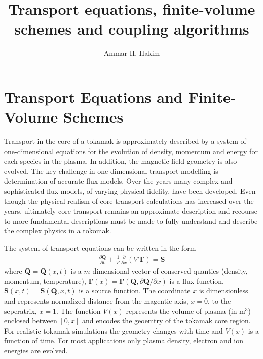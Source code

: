 \documentclass[11pt]{amsart}
\title{Transport equations, finite-volume schemes and coupling
  algorithms}%
\author{Ammar H. Hakim}%
\date{}
\newcommand{\pfrac}[2]{\frac{\partial #1}{\partial #2}}
\newcommand{\pfraca}[1]{\frac{\partial}{\partial #1}}
\newcommand{\pfracb}[2]{\partial #1/\partial #2}
\newcommand{\mvec}[1]{\mathbf{#1}}
\newcommand{\gvec}[1]{\boldsymbol{#1}}
\begin{document}
\maketitle

\section{Transport Equations and Finite-Volume Schemes}

Transport in the core of a tokamak is approximately described by a
system of one-dimensional equations for the evolution of density,
momentum and energy for each species in the plasma. In addition, the
magnetic field geometry is also evolved. The key challenge in
one-dimensional transport modelling is determination of accurate flux
models. Over the years many complex and sophisticated flux models, of
varying physical fidelity, have been developed. Even though the
physical realism of core transport calculations has increased over the
years, ultimately core transport remains an approximate description
and recourse to more fundamental descriptions must be made to fully
understand and describe the complex physics in a tokomak.

The system of transport equations can be written in the form
\begin{align}
  \pfrac{\mvec{Q}}{t} 
  + \frac{1}{V'} \pfraca{x} \left( V' \gvec{\Gamma} \right) = \mvec{S}
\end{align}
where $\mvec{Q} = \mvec{Q}(x,t)$ is a $m$-dimensional vector of
conserved quanties (density, momentum, temperature), $\gvec{\Gamma}(x)
= \gvec{\Gamma}(\mvec{Q},\pfracb{\mvec{Q}}{x})$ is a flux function,
$\mvec{S}(x,t) = \mvec{S}(\mvec{Q},x,t)$ is a source function. The
coordinate $x$ is dimensionless and represents normalized distance
from the magentic axis, $x=0$, to the seperatrix, $x=1$. The function
$V(x)$ represents the volume of plasma (in m$^3$) enclosed between
$[0,x]$ and encodes the geoemtry of the tokamak core region. For
realistic tokamak simulations the geometry changes with time and
$V(x)$ is a function of time. For most applications only plasma
density, electron and ion energies are evolved.
\end{document}
